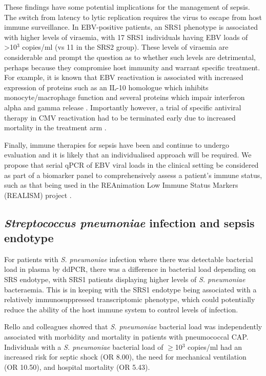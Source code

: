 These findings have some potential implications for the management of sepsis. The switch from latency to lytic replication requires the virus to escape from host immune surveillance. In EBV-positive patients, an SRS1 phenotype is associated with higher levels of viraemia, with 17 SRS1 individuals having EBV loads of >10$^3$ copies/ml (vs 11 in the SRS2 group). These levels of viraemia are considerable and prompt the question as to whether such levels are detrimental, perhaps because they compromise host immunity and warrant specific treatment. For example, it is known that EBV reactivation is associated with increased expression of proteins such as an IL-10 homologue which inhibits monocyte/macrophage function \parencite{Moore2001} and several proteins which impair interferon alpha and gamma release \parencite{Morrison2001} \parencite{Cohen1999}. Importantly however, a trial of specific antiviral therapy in CMV reactivation had to be terminated early due to increased mortality in the treatment arm \parencite{Cowley2017}.

Finally, immune therapies for sepsis have been and continue to undergo evaluation and it is likely that an individualised approach will be required. We propose that serial qPCR of EBV viral loads in the clinical setting be considered as part of a biomarker panel to comprehensively assess a patient's immune status, such as that being used in the REAnimation Low Immune Status Markers (REALISM) project \parencite{Rol2017}.

\subsection{\textit{Streptococcus pneumoniae} infection and sepsis endotype}

For patients with \textit{S. pneumoniae} infection where there was detectable bacterial load in plasma by ddPCR, there was a difference in bacterial load depending on SRS endotype, with SRS1 patients displaying higher levels of \textit{S. pneumoniae} bacteraemia. This is in keeping with the SRS1 endotype being associated with a relatively immunosuppressed transcriptomic phenotype, which could potentially reduce the ability of the host immune system to control levels of infection. 

Rello and colleagues \parencite{Rello2009} showed that \textit{S. pneumoniae} bacterial load was independently associated with morbidity and mortality in patients with pneumococcal CAP. Individuals with a \textit{S. pneumoniae} bacterial load of $\geq$10$^3$ copies/ml had an increased risk for septic shock (OR 8.00), the need for mechanical ventilation (OR 10.50), and hospital mortality (OR 5.43).

